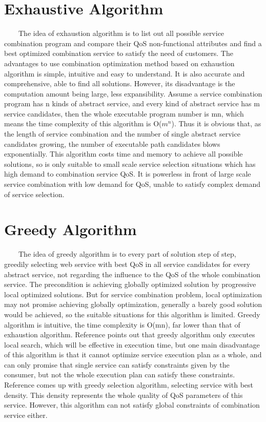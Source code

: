 \documentclass[senior,final,11pt]{iscs-thesis}
\begin{document}
\section{Exhaustive Algorithm}
~~~~The idea of exhaustion algorithm is to list out all possible service combination program and compare their QoS non-functional attributes and find a best optimized combination service to satisfy the need of customers. The advantages to use combination optimization method based on exhaustion algorithm is simple, intuitive and easy to understand. It is also accurate and comprehensive, able to find all solutions. However, its disadvantage is the computation amount being large, less expansibility.
Assume a service combination program has n kinds of abstract service, and every kind of abstract service has m service candidates, then the whole executable program number is mn, which means the time complexity of this algorithm is O($m^n$). Thus it is obvious that, as the length of service combination and the number of single abstract service candidates growing, the number of executable path candidates blows exponentially. This algorithm costs time and memory to achieve all possible solutions, so is only suitable to small scale service selection situations which has high demand to combination service QoS. It is powerless in front of large scale service combination with low demand for QoS, unable to satisfy complex demand of service selection.
\section{Greedy Algorithm}
~~~~The idea of greedy algorithm is to every part of solution step of step, greedily selecting web service with best QoS in all service candidates for every abstract service, not regarding the influence to the QoS of the whole combination service. The precondition is achieving globally optimized solution by progressive local optimized solutions. But for service combination problem, local optimization may not promise achieving globally optimization, generally a barely good solution would be achieved, so the suitable situations for this algorithm is limited. Greedy algorithm is intuitive, the time complexity is O(mn), far lower than that of exhaustion algorithm. Reference \cite{12} points out that greedy algorithm only executes local search, which will be effective in execution time, but one main disadvantage of this algorithm is that it cannot optimize service execution plan as a whole, and can only promise that single service can satisfy constraints given by the consumer, but not the whole execution plan can satisfy these constraints. Reference \cite{13} comes up with greedy selection algorithm, selecting service with best density. This density represents the whole quality of QoS parameters of this service. However, this algorithm can not satisfy global constraints of combination service either.
\end{document}
